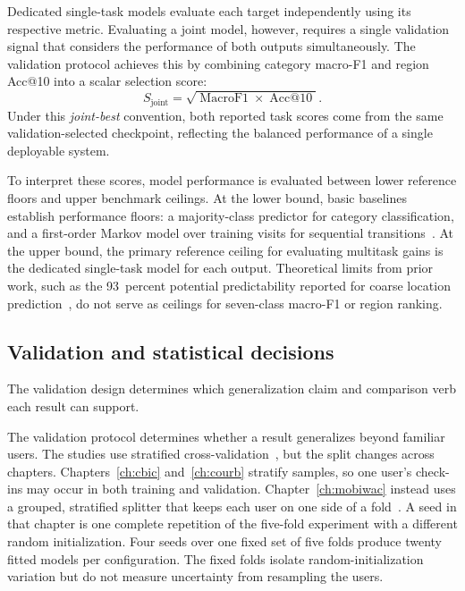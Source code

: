 Dedicated single-task models evaluate each target independently using its respective
metric. Evaluating a joint model, however, requires a single validation signal that
considers the performance of both outputs simultaneously. The validation protocol
achieves this by combining category macro-F1 and region Acc@10 into a scalar
selection score:
\begin{equation}\label{eq:fund:joint-selection}
    S_{\mathrm{joint}} = \sqrt{\operatorname{MacroF1} \times \operatorname{Acc@10}}.
\end{equation}
Under this \emph{joint-best} convention, both reported task scores come from the same
validation-selected checkpoint, reflecting the balanced performance of a single
deployable system.

To interpret these scores, model performance is evaluated between lower reference
floors and upper benchmark ceilings. At the lower bound, basic baselines establish
performance floors: a majority-class predictor for category classification, and a
first-order Markov model over training visits for sequential
transitions~\cite{gambs2012mmc}. At the upper bound, the primary reference ceiling for
evaluating multitask gains is the dedicated single-task model for each output.
Theoretical limits from prior work, such as the 93~percent potential predictability
reported for coarse location prediction~\cite{song2010limits}, do not serve as
ceilings for seven-class macro-F1 or region ranking.

\subsection{Validation and statistical decisions}

The validation design determines which generalization claim and comparison verb each
result can support.

The validation protocol determines whether a result generalizes beyond familiar
users. The studies use stratified cross-validation~\cite{kohavi1995crossval}, but the
split changes across chapters. Chapters~\ref{ch:cbic} and~\ref{ch:courb} stratify
samples, so one user's check-ins may occur in both training and validation.
Chapter~\ref{ch:mobiwac} instead uses a grouped, stratified splitter that keeps each
user on one side of a fold~\cite{pedregosa2011sklearn}. A seed in that chapter is one
complete repetition of the five-fold experiment with a different random
initialization. Four seeds over one fixed set of five folds produce twenty fitted
models per configuration. The fixed folds isolate random-initialization variation but
do not measure uncertainty from resampling the users.

